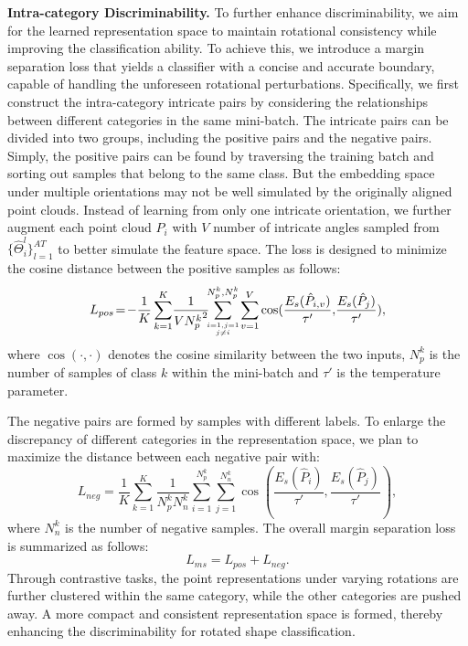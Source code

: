\noindent\textbf{Intra-category Discriminability.} To further enhance discriminability, we aim for the learned representation space to maintain rotational consistency while improving the classification ability. To achieve this, we introduce a margin separation loss that yields a classifier with a concise and accurate boundary, capable of handling the unforeseen rotational perturbations. Specifically, we first construct the intra-category intricate pairs by considering the relationships between different categories in the same mini-batch. The intricate pairs can be divided into two groups, including the positive pairs and the negative pairs.
Simply, the positive pairs can be found by traversing the training batch and sorting out samples that belong to the same class. But the embedding space under multiple orientations may not be well simulated by the originally aligned point clouds. Instead of learning from only one intricate orientation, we further augment each point cloud $P_{i}$ with $V$ number of intricate angles sampled from $\{\hat{\Theta}^l_{i}\}^{AT}_{l=1}$ to better simulate the feature space. The loss is designed to minimize the cosine distance between the positive samples as follows:
\begin{equation}
    L_{pos}\!=\!- \frac{1}{K}\sum_{k=1}^{K} \!\frac{1}{V{N^k_p}^2}\!\!\!\sum_{i=1,j=1 \atop j\neq i}^{N^k_{p}, N^k_{p}}\!\sum_{v=1}^{V} \cos(\frac{E_s(\hat{P}_{i,v})}{\tau'},\! \frac{E_s(\hat{P}_j)}{\tau'}),
    \label{eq6}
\end{equation}
where $\cos(\cdot, \cdot)$ denotes the cosine similarity between the two inputs, $N^k_{p}$ is the number of samples of class $k$ within the mini-batch and $\tau'$ is the temperature parameter.

The negative pairs are formed by samples with different labels.
To enlarge the discrepancy of different categories in the representation space, we plan to maximize the distance between each negative pair with:
\begin{equation}
    L_{neg}\!=\!\frac{1}{K}\sum_{k=1}^{K}  \frac{1}{{N^k_p}{N^k_n}}\sum_{i=1}^{N^k_p} \sum_{j=1}^{N^k_{n}} \cos( \frac{E_s(\hat{P}_i)}{\tau'}, \frac{E_s(\hat{P}_j)}{\tau'}),
    \label{eq7}
\end{equation}
where $N^k_{n}$ is the number of negative samples.
The overall margin separation loss is summarized as follows:
\begin{equation}
    L_{ms} = L_{pos} + L_{neg}.
\end{equation}Through contrastive tasks, the point representations under varying rotations are further clustered within the same category, while the other categories are pushed away. A more compact and consistent representation space is formed, thereby enhancing the discriminability for rotated shape classification.

